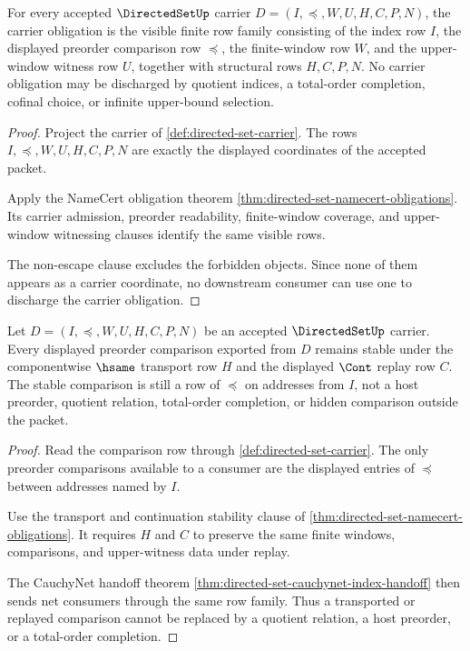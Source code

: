 \begin{theorem}
\label{thm:directedset-carrier-obligation}
For every accepted $\DirectedSetUp$ carrier $D=(I,\preceq,W,U,H,C,P,N)$, the carrier obligation is the visible finite row family consisting of the index row $I$, the displayed preorder comparison row $\preceq$, the finite-window row $W$, and the upper-window witness row $U$, together with structural rows $H,C,P,N$. No carrier obligation may be discharged by quotient indices, a total-order completion, cofinal choice, or infinite upper-bound selection.
\end{theorem}
\begin{proof}
Project the carrier of \autoref{def:directed-set-carrier}. The rows $I,\preceq,W,U,H,C,P,N$ are exactly the displayed coordinates of the accepted packet.

Apply the NameCert obligation theorem \autoref{thm:directed-set-namecert-obligations}. Its carrier admission, preorder readability, finite-window coverage, and upper-window witnessing clauses identify the same visible rows.

The non-escape clause excludes the forbidden objects. Since none of them appears as a carrier coordinate, no downstream consumer can use one to discharge the carrier obligation.
\end{proof}

\begin{theorem}
\label{thm:directedset-preorder-stability-obligation}
Let $D=(I,\preceq,W,U,H,C,P,N)$ be an accepted $\DirectedSetUp$ carrier. Every displayed preorder comparison exported from $D$ remains stable under the componentwise $\hsame$ transport row $H$ and the displayed $\Cont$ replay row $C$. The stable comparison is still a row of $\preceq$ on addresses from $I$, not a host preorder, quotient relation, total-order completion, or hidden comparison outside the packet.
\end{theorem}
\begin{proof}
Read the comparison row through \autoref{def:directed-set-carrier}. The only preorder comparisons available to a consumer are the displayed entries of $\preceq$ between addresses named by $I$.

Use the transport and continuation stability clause of \autoref{thm:directed-set-namecert-obligations}. It requires $H$ and $C$ to preserve the same finite windows, comparisons, and upper-witness data under replay.

The CauchyNet handoff theorem \autoref{thm:directed-set-cauchynet-index-handoff} then sends net consumers through the same row family. Thus a transported or replayed comparison cannot be replaced by a quotient relation, a host preorder, or a total-order completion.
\end{proof}

